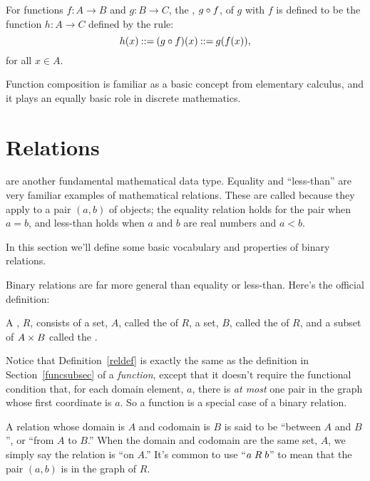 \begin{definition}\label{func_compose_def}
  For functions $f:A \to B$ and $g:B \to C$, the ,
  $g \circ f$, of $g$ with $f$ is defined to be the function
  $h:A \to C$ defined by the rule:
\begin{displaymath}
h(x) \mathbin{::=} (g \circ f)(x) \mathbin{::=} g(f(x)),
\end{displaymath}
for all $x \in A$.
\end{definition}

Function composition is familiar as a basic concept from elementary
calculus, and it plays an equally basic role in discrete mathematics.

\section{Relations}\label{rel_sec}

 are another fundamental mathematical data type.  Equality
and ``less-than'' are very familiar examples of mathematical relations.
These are called  because they apply to a pair
$(a,b)$ of objects; the equality relation holds for the pair when $a=b$,
and less-than holds when $a$ and $b$ are real numbers and $a < b$.

In this section we'll define some basic vocabulary and properties of binary
relations.

Binary relations are far more general than equality or less-than.
Here's the official definition:
\begin{definition}\label{reldef}
A , $R$, consists of a set, $A$, called
the  of $R$, a set, $B$, called the  of $R$, and
a subset of $A \times B$ called the .
\end{definition}

Notice that Definition~\ref{reldef} is exactly the same as the definition
in Section~\ref{funcsubsec} of a {\emph{function}}, except that it doesn't
require the functional condition that, for each domain element, $a$, there
is \emph{at most} one pair in the graph whose first coordinate is $a$.  So
a function is a special case of a binary relation.

A relation whose domain is $A$ and codomain is $B$ is said to be
``between $A$ and $B$'', or ``from $A$ to $B$.''  When the domain and
codomain are the same set, $A$, we simply say the  relation is ``on $A$.''  It's common to use 
``$a \mathrel{R} b$'' to mean that the pair $(a,b)$ is in the graph of
$R$.


